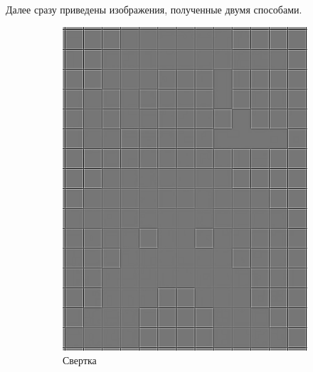 \documentclass[a4paper, 12pt]{article}
\begin{document}
    Далее сразу приведены изображения, полученные двумя способами.
    \begin{figure}[H]
        \centering
        \begin{subfigure}{0.35\textwidth}
            \centering
            \includegraphics[width=\linewidth]{edgen_conv2.png}
            \caption{Свертка}
            \label{fig:padotpngnew}
        \end{subfigure}
        \hspace{10mm}
        \begin{subfigure}{0.35\textwidth}
            \centering

\end{subfigure}
\end{figure}
\end{document}

